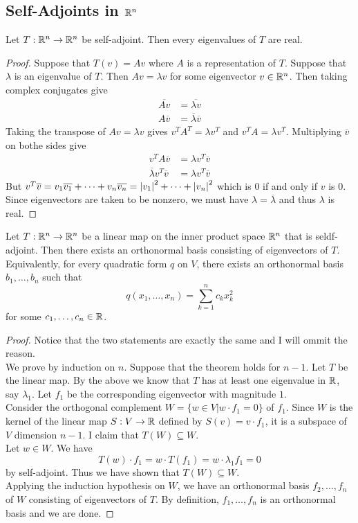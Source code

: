 \documentclass[a4paper]{article}
\begin{document}
\subsection{Self-Adjoints in $\mathbb{R}^n$}
\begin{prp}{}{} Let $T:\mathbb{R}^n\to\mathbb{R}^n$ be self-adjoint. Then every eigenvalues of $T$ are real. 
\begin{proof}
Suppose that $T(v)=Av$ where $A$ is a representation of $T$. Suppose that $\lambda$ is an eigenvalue of $T$. Then $Av=\lambda v$ for some eigenvector $v\in\mathbb{R}^n$. Then taking complex conjugates give 
\begin{align*}
\overline{Av}&=\overline{\lambda v}\\
A\overline{v}&=\overline{\lambda}\overline{v}
\end{align*}
Taking the transpose of $Av=\lambda v$ gives $v^TA^T=\lambda v^T$ and $v^TA=\lambda v^T$. Multiplying $\overline{v}$ on bothe sides give 
\begin{align*}
v^TA\overline{v}&=\lambda v^T\overline{v}\\
\overline{\lambda}v^T\overline{v}&=\lambda v^T\overline{v}
\end{align*}
But $v^T\overline{v}=v_1\overline{v_1}+\dots+v_n\overline{v_n}=\abs{v_1}^2+\dots+\abs{v_n}^2$ which is $0$ if and only if $v$ is $0$. Since eigenvectors are taken to be nonzero, we must have $\lambda=\overline{\lambda}$ and thus $\lambda$ is real. 
\end{proof}
\end{prp}

\begin{thm}{}{} Let $T:\mathbb{R}^n\to\mathbb{R}^n$ be a linear map on the inner product space $\mathbb{R}^n$ that is seldf-adjoint. Then there exists an orthonormal basis consisting of eigenvectors of $T$. \\
Equivalently, for every quadratic form $q$ on $V$, there exists an orthonormal basis $b_1,\dots,b_n$ such that $$q(x_1,\dots,x_n)=\sum_{k=1}^nc_kx_k^2$$ for some $c_1,\dots,c_n\in\mathbb{R}$. 
\begin{proof}
Notice that the two statements are exactly the same and I will ommit the reason. \\
We prove by induction on $n$. Suppose that the theorem holds for $n-1$. Let $T$ be the linear map. By the above we know that $T$ has at least one eigenvalue in $\mathbb{R}$, say $\lambda_1$. Let $f_1$ be the corresponding eigenvector with magnitude $1$. \\
Consider the orthogonal complement $W=\{w\in V|w\cdot f_1=0\}$ of $f_1$. Since $W$ is the kernel of the linear map $S:V\to\mathbb{R}$ defined by $S(v)=v\cdot f_1$, it is a subspace of $V$ dimension $n-1$. I claim that $T(W)\subseteq W$. \\
Let $w\in W$. We have $$T(w)\cdot f_1=w\cdot T(f_1)=w\cdot\lambda_1f_1=0$$ by self-adjoint. Thus we have shown that $T(W)\subseteq W$. \\
Applying the induction hypothesis on $W$, we have an orthonormal basis $f_2,\dots,f_n$ of $W$ consisting of eigenvectors of $T$. By definition, $f_1,\dots,f_n$ is an orthonormal basis and we are done. 
\end{proof}
\end{thm}
\end{document}
